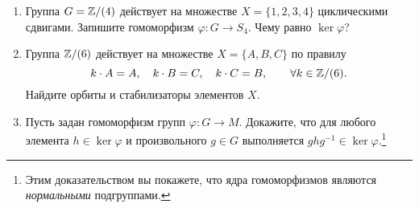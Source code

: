 \begin{enumerate}
     \item Группа $G = \mathbb Z / (4)$ действует на множестве $X = \{1, 2, 3, 4\}$ 
         циклическими сдвигами. Запишите гомоморфизм $\varphi \colon G \to S_4$.
         Чему равно $\ker \varphi$?
     \item Группа $\mathbb Z / (6)$ действует на множестве $X = \{A, B, C\}$ по правилу
          $$k \cdot A = A, \quad k \cdot B = C, \quad k \cdot C = B, \qquad \forall k \in \mathbb Z / (6).$$
          Найдите орбиты и стабилизаторы элементов $X$.
     \item Пусть задан гомоморфизм групп $\varphi \colon G \to M$. 
        Докажите, что для любого элемента $h \in \ker \varphi$ и произвольного $g \in G$
        выполняется $ghg^{-1} \in \ker \varphi$.\footnote{
        Этим доказательством вы покажете, что ядра гомоморфизмов являются \emph{нормальными} подгруппами.}
\end{enumerate}
